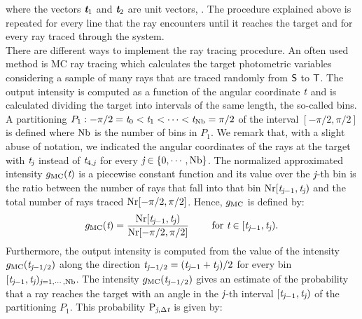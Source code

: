 where the vectors $\textit{\textbf{t}}_{1}$ and $\textit{\textbf{t}}_{2}$ are unit vectors, \cite{Chaves}.
The procedure explained above is repeated for every line that the ray encounters until it reaches the target and for every ray traced through the system. \\ \indent
There are different ways to implement the ray tracing procedure.
An often used method is MC ray tracing which calculates the target photometric variables considering a sample of many rays that are traced randomly from $\textsf{S}$ to $\textsf{T}$. The output intensity is computed as a 
function of the angular coordinate $\textit{t}$ and is calculated dividing the target into intervals of the same length, the so-called bins. A partitioning 
$P_1: -\pi/2 = \textit{t}_{0}<\textit{t}_{1}<\cdots <\textit{t}_{\textrm{Nb}}=\pi/2$ of the interval $[-\pi/2, \pi/2]$ is defined where $\textrm{Nb}$ is the number of bins in $P_1$.
We remark that, with a slight abuse of notation, we indicated the angular coordinates of the rays at the target with $\textit{t}_{\textit{j}}$ instead of $\textit{t}_{4,\textit{j}}$ for every $\textit{j}\in\{0, \cdots, \textrm{Nb}\}$.
The normalized approximated intensity $g_{\textrm{MC}}(\textit{t})$ is a piecewise constant function and its value over the $\textit{j}$-th bin is the ratio between the number of rays that fall into that bin
$\textrm{Nr}[\textit{t}_{\textit{j}-1},\textit{t}_{\textit{j}})$ and the total number of rays traced $\textrm{Nr}[-\pi/2, \pi/2]$.
Hence, $g_{\textrm{MC}}$ is defined by:
\begin{equation} \label{g_mc}
g_{\textrm{MC}}(\textit{t}) = \frac{\textrm{Nr}[\textit{t}_{\textit{j}-1},\textit{t}_{\textit{j}})}{\textrm{Nr}[-\pi/2, \pi/2]} \qquad \mbox{ for } \textit{t}\in[\textit{t}_{\textit{j}-1}, \textit{t}_{\textit{j}}).
\end{equation}
Furthermore, the output intensity is computed from the value of the intensity $g_{\textrm{MC}}(\textit{t}_{\textit{j}-1/2})$ along the direction $\textit{t}_{\textit{j}-1/2}=(\textit{t}_{\textit{j}-1}+
\textit{t}_{\textit{j}})/2$ for every bin $[\textit{t}_{\textit{j}-1},\textit{t}_{\textit{j}})_{\textit{j} = 1, \cdots, \textrm{Nb}}$.
 The intensity $g_{\textrm{MC}}(\textit{t}_{\textit{j}-1/2})$ gives an estimate of the probability that a ray reaches the target with an angle in the $\textit{j}$-th interval 
$[\textit{t}_{\textit{j}-1}, \textit{t}_{\textit{j}})$ of the partitioning $P_1$. This probability $\textrm{P}_{\textit{j}, \Delta\textit{t}}$ is given by:
